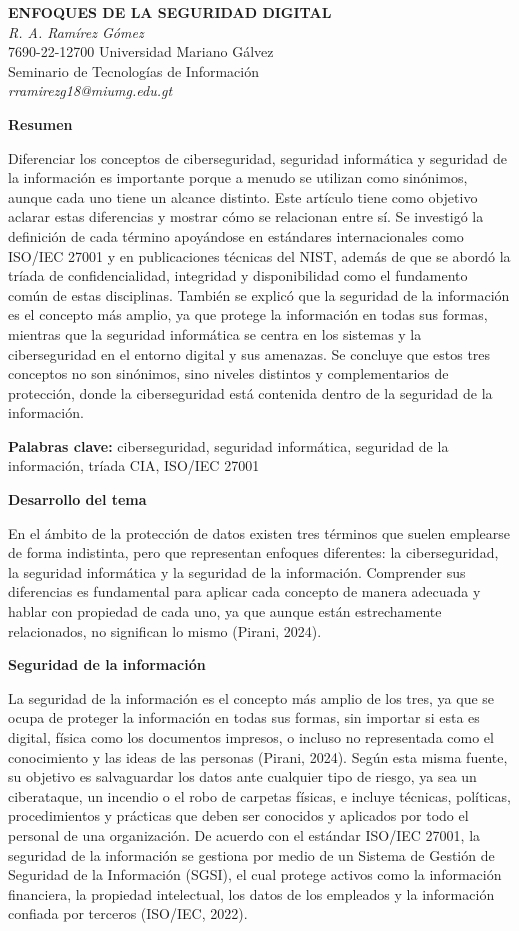 \documentclass[12pt,letterpaper]{article}
\newcommand{\subtitulo}[1]{\vspace{12pt}\noindent\textbf{#1}\par\vspace{10pt}}
\begin{document}
\begin{center}
\textbf{ENFOQUES DE LA SEGURIDAD DIGITAL}\\[8pt]
\textit{R. A. Ramírez Gómez}\\
7690-22-12700 Universidad Mariano Gálvez\\
Seminario de Tecnologías de Información\\
\textit{rramirezg18@miumg.edu.gt}
\end{center}

\vspace{10pt}

\subtitulo{Resumen}
Diferenciar los conceptos de ciberseguridad, seguridad informática y seguridad de la información es importante porque a menudo se utilizan como sinónimos, aunque cada uno tiene un alcance distinto. Este artículo tiene como objetivo aclarar estas diferencias y mostrar cómo se relacionan entre sí. Se investigó la definición de cada término apoyándose en estándares internacionales como ISO/IEC 27001 y en publicaciones técnicas del NIST, además de que se abordó la tríada de confidencialidad, integridad y disponibilidad como el fundamento común de estas disciplinas. También se explicó que la seguridad de la información es el concepto más amplio, ya que protege la información en todas sus formas, mientras que la seguridad informática se centra en los sistemas y la ciberseguridad en el entorno digital y sus amenazas. Se concluye que estos tres conceptos no son sinónimos, sino niveles distintos y complementarios de protección, donde la ciberseguridad está contenida dentro de la seguridad de la información.

\noindent\textbf{Palabras clave:} ciberseguridad, seguridad informática, seguridad de la información, tríada CIA, ISO/IEC 27001

\subtitulo{Desarrollo del tema}

En el ámbito de la protección de datos existen tres términos que suelen emplearse de forma indistinta, pero que representan enfoques diferentes: la ciberseguridad, la seguridad informática y la seguridad de la información. Comprender sus diferencias es fundamental para aplicar cada concepto de manera adecuada y hablar con propiedad de cada uno, ya que aunque están estrechamente relacionados, no significan lo mismo (Pirani, 2024).

\subtitulo{Seguridad de la información}
La seguridad de la información es el concepto más amplio de los tres, ya que se ocupa de proteger la información en todas sus formas, sin importar si esta es digital, física como los documentos impresos, o incluso no representada como el conocimiento y las ideas de las personas (Pirani, 2024). Según esta misma fuente, su objetivo es salvaguardar los datos ante cualquier tipo de riesgo, ya sea un ciberataque, un incendio o el robo de carpetas físicas, e incluye técnicas, políticas, procedimientos y prácticas que deben ser conocidos y aplicados por todo el personal de una organización. De acuerdo con el estándar ISO/IEC 27001, la seguridad de la información se gestiona por medio de un Sistema de Gestión de Seguridad de la Información (SGSI), el cual protege activos como la información financiera, la propiedad intelectual, los datos de los empleados y la información confiada por terceros (ISO/IEC, 2022).
\end{document}
